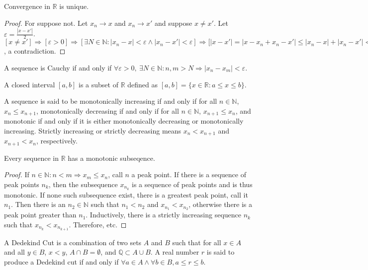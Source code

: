 \documentclass[crop=false,class=book]{standalone}
\begin{document}
\begin{theorem}
Convergence in $\mathbb{R}$ is unique.
\end{theorem}
\begin{proof}
For suppose not. Let $x_n \rightarrow x$ and $x_n \rightarrow x'$ and suppose $x\ne x'$. Let $\varepsilon = \frac{|x-x'|}{2}$. $[x\ne x']\Rightarrow [\varepsilon>0]\Rightarrow [\exists N\in\mathbb{N}:|x_n-x|<\varepsilon\land |x_n-x'| <\varepsilon]\Rightarrow \big[|x-x'|=|x-x_n+x_n-x'|\leq |x_n-x|+|x_n-x'|<2\varepsilon = |x-x'|\big]$, a contradiction.
\end{proof}
\begin{definition}
A sequence is Cauchy if and only if $\forall \varepsilon>0,\ \exists N\in \mathbb{N}: n,m>N\Rightarrow |x_n-x_m|<\varepsilon$.
\end{definition}
\begin{definition}
A closed interval $[a,b]$ is a subset of $\mathbb{R}$ defined as $[a,b] = \{x\in\mathbb{R}:a\leq x\leq b\}$. 
\end{definition}
\begin{definition}
A sequence is said to be monotonically increasing if and only if for all $n\in \mathbb{N}$, $x_n \leq x_{n+1}$, monotonically decreasing if and only if for all $n\in \mathbb{N}$, $x_{n+1} \leq x_{n}$, and monotonic if and only if it is either monotonically decreasing or monotonically increasing. Strictly increasing or strictly decreasing means $x_{n}<x_{n+1}$ and $x_{n+1}<x_n$, respectively.
\end{definition}
\begin{theorem}
Every sequence in $\mathbb{R}$ has a monotonic subseqence.
\end{theorem}
\begin{proof}
If $n\in \mathbb{N}:n<m\Rightarrow x_m \leq x_n$, call $n$ a peak point. If there is a sequence of peak points $n_k$, then the subsequence $x_{n_k}$ is a sequence of peak points and is thus monotonic. If none such subsequence exist, there is a greatest peak point, call it $n_1$. Then there is an $n_2\in \mathbb{N}$ such that $n_1 < n_2$ and $x_{n_1}< x_{n_2}$, otherwise there is a peak point greater than $n_1$. Inductively, there is a strictly increasing sequence $n_k$ such that $x_{n_k}< x_{n_{k+1}}$. Therefore, etc.
\end{proof}
\begin{definition}
A Dedekind Cut is a combination of two sets $A$ and $B$ such that for all $x\in A$ and all $y\in B$, $x< y$, $A\cap B=\emptyset$, and $\mathbb{Q} \subset A\cup B$. A real number $r$ is said to produce a Dedekind cut if and only if $\forall a\in A\land \forall b\in B, a\leq r\leq b$.
\end{definition}
\end{document}
